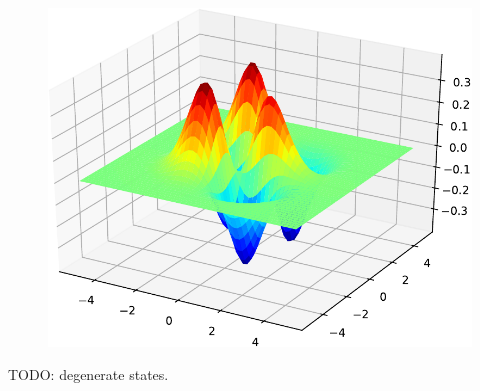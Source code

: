 \begin{figure}[H]
{\includegraphics[scale=0.3]{../codes/sch_2d/IMG_harmonic_psi_10.pdf}
\par}
\label{fig:harm_2d_eigenfunctions}
\end{figure}

TODO: degenerate states.